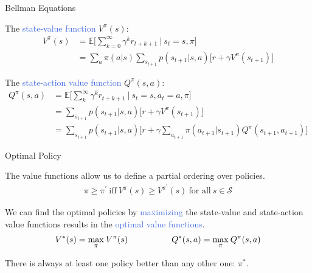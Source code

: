 \documentclass{beamer}
\begin{document}
\begin{frame}{Bellman Equations}


The \textcolor{RoyalBlue}{state-value function} $V^{\pi}(s)$:
\begin{align*}
V^{\pi}(s) & = \mathds{E} \bigg[\sum_{k=0}^{\infty}\gamma^{k} r_{t+k+1} \: \bigg| \: s_t=s,\pi \bigg] \\
   & = \sum_a \pi(a|s) \sum_{s_{t+1}} p(s_{t+1}|s,a)\big[r + \gamma V^{\pi}(s_{t+1}) \big] 
\end{align*}

The \textcolor{RoyalBlue}{state-action value function} $Q^{\pi}(s,a)$:
\begin{align*}
	Q^{\pi}(s,a) & = \mathds{E} \bigg[\sum_{k}^{\infty}\gamma^{k} r_{t+k+1} \: \bigg| \: s_t=s, a_t=a,\pi \bigg] \\
	& = \sum_{s_{t+1}} p(s_{t+1}|s,a)\big[r + \gamma V^{\pi}(s_{t+1}) \big] \\
	& = \sum_{s_{t+1}} p(s_{t+1}|s,a)\big[r + \gamma \sum_{a_{t+1}} \pi(a_{t+1}|s_{t+1}) Q^{\pi}(s_{t+1}, a_{t+1}) \big]
\end{align*}
		
\end{frame}



\begin{frame}{Optimal Policy}

The value functions allow us to define a partial ordering over policies. 
	\begin{align*}
		\pi \geq \pi^{\prime}\: \text{iff}\: V^{\pi}(s) \geq V^{\pi^{'}}(s) \: \text{for all}\: s\in\mathcal{S}
	\end{align*}
	
	We can find the optimal policies by \textcolor{RoyalBlue}{maximizing} the state-value and state-action value functions results in the \textcolor{RoyalBlue}{optimal value functions}.
	\begin{align*}
	V^{*}(s)=\underset{\pi}{\max}\:V^{\pi}(s) \hspace{18mm} Q^{*}(s,a)= \underset{\pi}{\max}\:Q^{\pi}(s,a)
	\end{align*}

There is always at least one policy better than any other one: $\pi^{*}$.

\end{frame}
\end{document}
